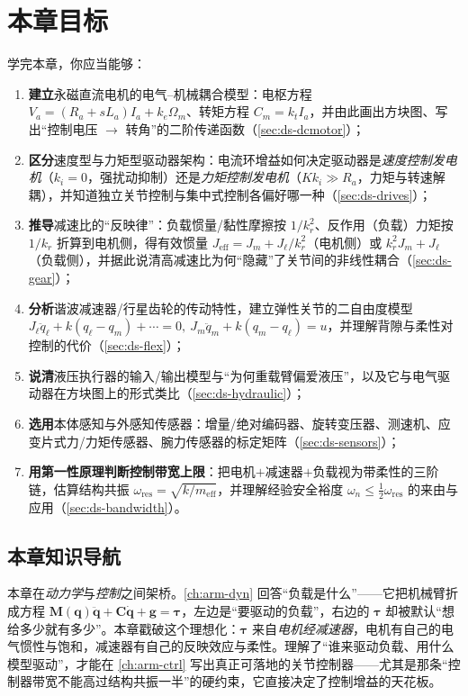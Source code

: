 \section*{本章目标}
学完本章，你应当能够：
\begin{enumerate}
  \item \textbf{建立}永磁直流电机的电气--机械耦合模型：电枢方程 $V_a=(R_a+sL_a)I_a+k_e\Omega_m$、转矩方程 $C_m=k_tI_a$，并由此画出方块图、写出“控制电压 $\to$ 转角”的二阶传递函数（\cref{sec:ds-dcmotor}）；
  \item \textbf{区分}速度型与力矩型驱动器架构：电流环增益如何决定驱动器是\emph{速度控制发电机}（$k_i=0$，强扰动抑制）还是\emph{力矩控制发电机}（$Kk_i\gg R_a$，力矩与转速解耦），并知道独立关节控制与集中式控制各偏好哪一种（\cref{sec:ds-drives}）；
  \item \textbf{推导}减速比的“反映律”：负载惯量/黏性摩擦按 $1/k_r^2$、反作用（负载）力矩按 $1/k_r$ 折算到电机侧，得有效惯量 $J_{\mathrm{eff}}=J_m+J_\ell/k_r^2$（电机侧）或 $k_r^2 J_m+J_\ell$（负载侧），并据此说清高减速比为何“隐藏”了关节间的非线性耦合（\cref{sec:ds-gear}）；
  \item \textbf{分析}谐波减速器/行星齿轮的传动特性，建立弹性关节的二自由度模型 $J_\ell\ddot{q}_\ell+k(q_\ell-q_m)+\cdots=0,\ J_m\ddot{q}_m+k(q_m-q_\ell)=u$，并理解背隙与柔性对控制的代价（\cref{sec:ds-flex}）；
  \item \textbf{说清}液压执行器的输入/输出模型与“为何重载臂偏爱液压”，以及它与电气驱动器在方块图上的形式类比（\cref{sec:ds-hydraulic}）；
  \item \textbf{选用}本体感知与外感知传感器：增量/绝对编码器、旋转变压器、测速机、应变片式力/力矩传感器、腕力传感器的标定矩阵（\cref{sec:ds-sensors}）；
  \item \textbf{用第一性原理判断控制带宽上限}：把电机$+$减速器$+$负载视为带柔性的三阶链，估算结构共振 $\omega_{\mathrm{res}}=\sqrt{k/m_{\mathrm{eff}}}$，并理解经验安全裕度 $\omega_n\le\tfrac12\omega_{\mathrm{res}}$ 的来由与应用（\cref{sec:ds-bandwidth}）。
\end{enumerate}

\subsection*{本章知识导航}
本章在\emph{动力学}与\emph{控制}之间架桥。\cref{ch:arm-dyn} 回答“负载是什么”——它把机械臂折成方程 $\mathbf{M}(\mathbf{q})\ddot{\mathbf{q}}+\mathbf{C}\dot{\mathbf{q}}+\mathbf{g}=\boldsymbol{\tau}$，左边是“要驱动的负载”，右边的 $\boldsymbol{\tau}$ 却被默认“想给多少就有多少”。本章戳破这个理想化：$\boldsymbol{\tau}$ 来自\emph{电机经减速器}，电机有自己的电气惯性与饱和，减速器有自己的反映效应与柔性。理解了“谁来驱动负载、用什么模型驱动”，才能在 \cref{ch:arm-ctrl} 写出真正可落地的关节控制器——尤其是那条“控制器带宽不能高过结构共振一半”的硬约束，它直接决定了控制增益的天花板。

